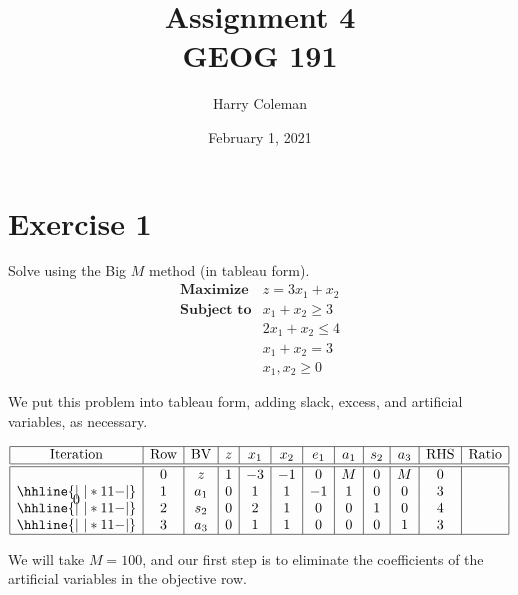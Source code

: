 \documentclass[12pt]{article}
\title{Assignment 4\\
    \large GEOG 191
}
\author{Harry Coleman}
\date{February 1, 2021}
\newenvironment{problem}
    {\begin{lrbox}{\mybox}\begin{minipage}{0.98\textwidth}}
    {\end{minipage}\end{lrbox}\begin{center}\framebox[\textwidth]{\usebox{\mybox}}\end{center}}
\theoremstyle{definition}
\begin{document}
\maketitle

\section*{Exercise 1}
\begin{problem}
    Solve using the Big $M$ method (in tableau form).
    \[
        \begin{array}{ll}
            \textbf{Maximize} & z = 3x_1 + x_2 \\
            \textbf{Subject to} & x_1 + x_2 \geq 3 \\
                & 2x_1 + x_2 \leq 4 \\
                & x_1 + x_2 = 3 \\
                & x_1, x_2 \geq 0
        \end{array}
    \]
\end{problem}

We put this problem into tableau form, adding slack, excess, and artificial variables, as necessary.

\[\begin{array}{*{12}{|c}|}
    \hline
    \text{Iteration} & \text{Row} & \text{BV} & z & x_1 & x_2 & e_1 & a_1 & s_2 & a_3 & \text{RHS} & \text{Ratio} \\\hline\hline
    \multirow{4}*{0}
    & 0 & z   & 1 & -3 & -1 & 0 & M & 0 & M  & 0 &\\\hhline{|~|*{11}{-}|}
    & 1 & a_1 & 0 & 1  & 1  & -1 & 1 & 0 & 0 & 3 & \\\hhline{|~|*{11}{-}|}
    & 2 & s_2 & 0 & 2  & 1  & 0 & 0 & 1 & 0 & 4 & \\\hhline{|~|*{11}{-}|}
    & 3 & a_3 & 0 & 1  & 1  & 0 & 0 & 0 & 1 & 3 & \\\hline
\end{array}\]

 We will take $M = 100$, and our first step is to eliminate the coefficients of the artificial variables in the objective row.
 
\end{document}
